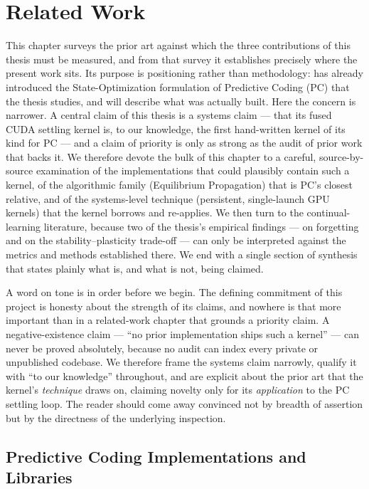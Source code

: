 \chapter{Related Work}\label{ch:related}

This chapter surveys the prior art against which the three contributions of this
thesis must be measured, and from that survey it establishes precisely where the
present work sits. Its purpose is positioning rather than methodology: 
has already introduced the State-Optimization formulation of Predictive Coding (PC)
that the thesis studies, and  will describe what was actually built.
Here the concern is narrower. A central claim of this thesis is a systems claim --- that
its fused CUDA settling kernel is, to our knowledge, the first hand-written kernel of its
kind for PC --- and a claim of priority is only as strong as the audit of prior work that
backs it. We therefore devote the bulk of this chapter to a careful, source-by-source
examination of the implementations that could plausibly contain such a kernel, of the
algorithmic family (Equilibrium Propagation) that is PC's closest relative, and of the
systems-level technique (persistent, single-launch GPU kernels) that the kernel borrows
and re-applies. We then turn to the continual-learning literature, because two of the
thesis's empirical findings --- on forgetting and on the stability--plasticity trade-off ---
can only be interpreted against the metrics and methods established there. We end with a
single section of synthesis that states plainly what is, and what is not, being claimed.

A word on tone is in order before we begin. The defining commitment of this project is
honesty about the strength of its claims, and nowhere is that more important than in a
related-work chapter that grounds a priority claim. A negative-existence claim --- ``no
prior implementation ships such a kernel'' --- can never be proved absolutely, because no
audit can index every private or unpublished codebase. We therefore frame the systems
claim narrowly, qualify it with ``to our knowledge'' throughout, and are explicit about
the prior art that the kernel's \emph{technique} draws on, claiming novelty only for its
\emph{application} to the PC settling loop. The reader should come away convinced not by
breadth of assertion but by the directness of the underlying inspection.

\section{Predictive Coding Implementations and Libraries}

